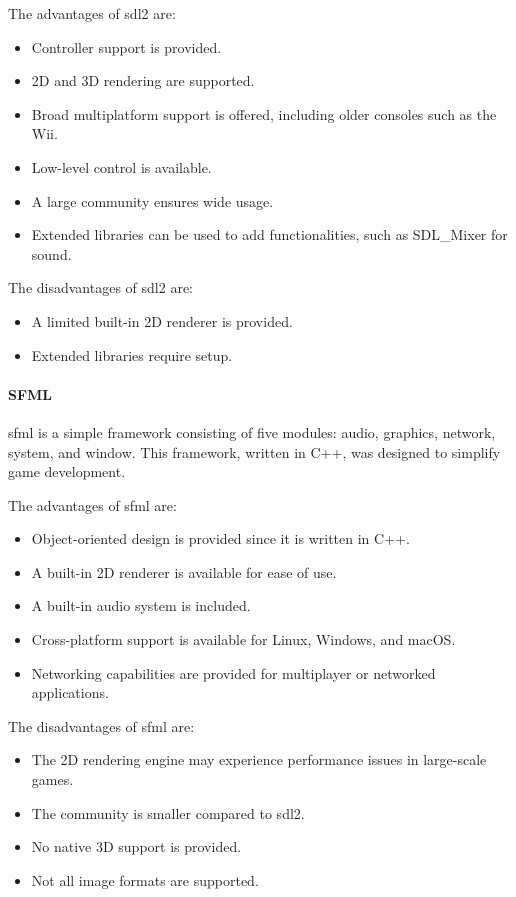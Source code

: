 \documentclass{projdoc}
\begin{document}
The advantages of \gls{sdl2} are:\noparbreak
\begin{itemize}
	\item Controller support is provided.
	\item 2D and 3D rendering are supported.
	\item Broad multiplatform support is offered, including older consoles such as the
		Wii.
	\item Low-level control is available.
	\item A large community ensures wide usage.
	\item Extended libraries can be used to add functionalities, such as SDL\_Mixer for
		sound.
\end{itemize}

The disadvantages of \gls{sdl2} are:\noparbreak
\begin{itemize}
	\item A limited built-in 2D renderer is provided.
	\item Extended libraries require setup.
\end{itemize}

\paragraph{SFML}

\gls{sfml} is a simple framework consisting of five modules: audio, graphics,
network, system, and window. This framework, written in C++, was designed to simplify
game development.

The advantages of \gls{sfml} are:
\begin{itemize}
	\item Object-oriented design is provided since it is written in C++.
	\item A built-in 2D renderer is available for ease of use.
	\item A built-in audio system is included.
	\item Cross-platform support is available for Linux, Windows, and macOS.
	\item Networking capabilities are provided for multiplayer or networked
		applications.
\end{itemize}

The disadvantages of \gls{sfml} are:
\begin{itemize}
	\item The 2D rendering engine may experience performance issues in large-scale
		games.
	\item The community is smaller compared to \gls{sdl2}.
	\item No native 3D support is provided.
	\item Not all image formats are supported.
\end{itemize}
\end{document}
